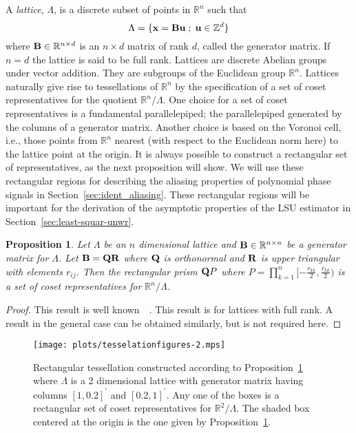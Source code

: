 \documentclass[aap]{imsart}
\newcommand{\reals}{{\mathbb R}}
\newcommand{\ints}{{\mathbb Z}}
\newcommand{\term}{\emph}
\renewcommand{\mid}{\; ; \;}
\newtheorem{proposition}{Proposition}
\begin{document}
A \term{lattice},  $\Lambda$, is a discrete subset of points in $\reals^n$ such that
\[
   \Lambda = \{\xbf = \Bbf\ubf \mid \ubf \in \ints^d \}
\]
where $\Bbf \in \reals^{n \times d}$ is an $n \times d$ matrix of rank $d$, called the generator matrix.  If $n = d$ the lattice is said to be full rank.  Lattices are discrete Abelian groups under vector addition.  They are subgroups of the Euclidean group $\reals^n$.  Lattices naturally give rise to tessellations of $\reals^n$ by the specification of a set of coset representatives for the quotient $\reals^n / \Lambda$.  One choice for a set of coset representatives is a fundamental parallelepiped; the parallelepiped generated by the columns of a generator matrix.  Another choice is based on the Voronoi cell, i.e., those points from $\reals^n$ nearest (with respect to the Euclidean norm here) to the lattice point at the origin.  It is always possible to construct a rectangular set of representatives, as the next proposition will show.  We will use these rectangular regions for describing the aliasing properties of polynomial phase signals in Section~\ref{sec:ident_aliasing}.  These rectangular regions will be important for the derivation of the asymptotic properties of the LSU estimator in Section~\ref{sec:least-squar-unwr}.

\begin{proposition}\label{prop:lattice-theory-constructing_a_rectangular_tesselating_region}
Let  $\Lambda$ be an $n$ dimensional lattice and $\Bbf \in \reals^{n\times n}$ be a generator matrix for $\Lambda$. Let $\mathbf{B} = \mathbf{Q}\mathbf{R}$ where $\mathbf{Q}$ is orthonormal and $\mathbf{R}$ is upper triangular with elements $r_{ij}$.  Then the rectangular prism $\mathbf{Q} P$ where $P = \prod_{k=1}^{n}{[-\tfrac{r_{kk}}{2}, \frac{r_{kk}}{2})}$ is a set of coset representatives for $\reals^n / \Lambda$.
\end{proposition}
\begin{proof}
This result is well known~\cite[Chapter IX, Theorem IV]{Cassels_geom_numbers_1997}~\cite[Proposition 2.1]{McKilliam2010thesis}.  This result is for lattices with full rank.  A result in the general case can be obtained similarly, but is not required here.  
\end{proof}

\begin{figure}[t]
	\centering
		\texttt{[image: plots/tesselationfigures-2.mps]}
		\caption{Rectangular tessellation constructed according to Proposition~\ref{prop:lattice-theory-constructing_a_rectangular_tesselating_region} where $\Lambda$ is a 2 dimensional lattice with generator matrix having columns $[1, 0.2]^\prime$ and $[0.2, 1]^\prime$. Any one of the boxes is a rectangular set of coset representatives for $\reals^2 / \Lambda$.  The shaded box centered at the origin is the one given by Proposition~\ref{prop:lattice-theory-constructing_a_rectangular_tesselating_region}.}
		\label{lattices:fig:tessellation2}
\end{figure} 
\end{document}
